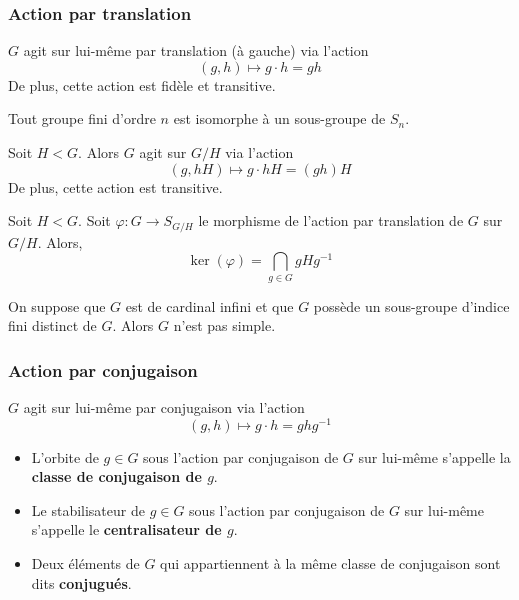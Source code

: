   \subsubsection{Action par translation}


  \begin{proposition}
    $G$ agit sur lui-même par translation (à gauche) via l'action
    \[ (g, h) \mapsto g \cdot h = gh \]
    De plus, cette action est fidèle et transitive.
  \end{proposition}

  \begin{application}
    Tout groupe fini d'ordre $n$ est isomorphe à un sous-groupe de $S_n$.
  \end{application}

  \begin{proposition}
    Soit $H < G$. Alors $G$ agit sur $G/H$ via l'action
    \[ (g, hH) \mapsto g \cdot hH = (gh)H \]
    De plus, cette action est transitive.
  \end{proposition}

  \begin{proposition}
    Soit $H < G$. Soit $\varphi : G \rightarrow S_{G/H}$ le morphisme de l'action par translation de $G$ sur $G/H$. Alors,
    \[ \ker(\varphi) = \bigcap_{g \in G} gHg^{-1} \]
  \end{proposition}


  \begin{application}
    On suppose que $G$ est de cardinal infini et que $G$ possède un sous-groupe d'indice fini distinct de $G$. Alors $G$ n'est pas simple.
  \end{application}

  \subsubsection{Action par conjugaison}


  \begin{proposition}
    $G$ agit sur lui-même par conjugaison via l'action
    \[ (g, h) \mapsto g \cdot h = ghg^{-1} \]
  \end{proposition}

  \begin{definition}
    \begin{itemize}
      \item L'orbite de $g \in G$ sous l'action par conjugaison de $G$ sur lui-même s'appelle la \textbf{classe de conjugaison de $g$}.
      \item Le stabilisateur de $g \in G$ sous l'action par conjugaison de $G$ sur lui-même s'appelle le \textbf{centralisateur de $g$}.
      \item Deux éléments de $G$ qui appartiennent à la même classe de conjugaison sont dits \textbf{conjugués}.
    \end{itemize}
  \end{definition}

